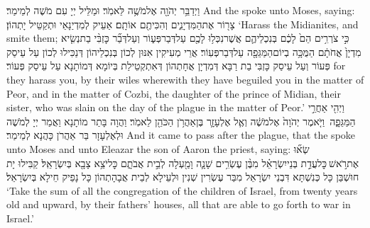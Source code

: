 {וַיְדַבֵּ֥ר יְהֹוָ֖ה אֶל\maqqaf מֹשֶׁ֥ה לֵּאמֹֽר׃}
{וּמַלֵּיל יְיָ עִם מֹשֶׁה לְמֵימַר׃}
{And the \lord\space spoke unto Moses, saying:}{}
{צָר֖וֹר אֶת\maqqaf הַמִּדְיָנִ֑ים וְהִכִּיתֶ֖ם אוֹתָֽם׃}
{אַעֵיק לְמִדְיַנָאֵי וּתְקַטֵּיל יָתְהוֹן׃}
{‘Harass the Midianites, and smite them;}{}
{כִּ֣י צֹרְרִ֥ים הֵם֙ לָכֶ֔ם בְּנִכְלֵיהֶ֛ם אֲשֶׁר\maqqaf נִכְּל֥וּ לָכֶ֖ם עַל\maqqaf דְּבַר\maqqaf פְּע֑וֹר וְעַל\maqqaf דְּבַ֞ר כׇּזְבִּ֨י בַת\maqqaf נְשִׂ֤יא מִדְיָן֙ אֲחֹתָ֔ם הַמֻּכָּ֥ה בְיוֹם\maqqaf הַמַּגֵּפָ֖ה עַל\maqqaf דְּבַר\maqqaf פְּעֽוֹר׃}
{אֲרֵי מְעִיקִין אִנּוּן לְכוֹן בְּנִכְלֵיהוֹן דְּנַכִּילוּ לְכוֹן עַל עֵיסַק פְּעוֹר וְעַל עֵיסַק כָּזְבִּי בַת רַבָּא דְּמִדְיָן אֲחָתְהוֹן דְּאִתְקְטֵילַת בְּיוֹמָא דְּמוֹתָנָא עַל עֵיסַק פְּעוֹר׃}
{for they harass you, by their wiles wherewith they have beguiled you in the matter of Peor, and in the matter of Cozbi, the daughter of the prince of Midian, their sister, who was slain on the day of the plague in the matter of Peor.’}{}
\newperek
{}%
{וַיְהִ֖י אַחֲרֵ֣י הַמַּגֵּפָ֑ה \petucha  וַיֹּ֤אמֶר יְהֹוָה֙ אֶל\maqqaf מֹשֶׁ֔ה וְאֶ֧ל אֶלְעָזָ֛ר בֶּן\maqqaf אַהֲרֹ֥ן הַכֹּהֵ֖ן לֵאמֹֽר׃}
{וַהֲוָה בָּתַר מוֹתָנָא וַאֲמַר יְיָ לְמֹשֶׁה וּלְאֶלְעָזָר בַּר אַהֲרֹן כָּהֲנָא לְמֵימַר׃}
{And it came to pass after the plague, that the \lord\space spoke unto Moses and unto Eleazar the son of Aaron the priest, saying:}{}
{שְׂא֞וּ אֶת\maqqaf רֹ֣אשׁ \legarmeh  כׇּל\maqqaf עֲדַ֣ת בְּנֵי\maqqaf יִשְׂרָאֵ֗ל מִבֶּ֨ן עֶשְׂרִ֥ים שָׁנָ֛ה וָמַ֖עְלָה לְבֵ֣ית אֲבֹתָ֑ם כׇּל\maqqaf יֹצֵ֥א צָבָ֖א בְּיִשְׂרָאֵֽל׃}
{קַבִּילוּ יָת חוּשְׁבַּן כָּל כְּנִשְׁתָּא דִּבְנֵי יִשְׂרָאֵל מִבַּר עֶשְׂרִין שְׁנִין וּלְעֵילָא לְבֵית אֲבָהָתְהוֹן כָּל נָפֵיק חֵילָא בְּיִשְׂרָאֵל׃}
{‘Take the sum of all the congregation of the children of Israel, from twenty years old and upward, by their fathers’ houses, all that are able to go forth to war in Israel.’}{}
